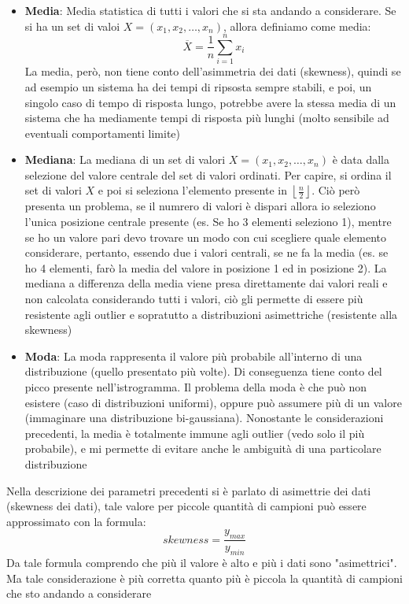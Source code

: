 \begin{itemize}
    \item \textbf{Media}: Media statistica di tutti i valori che si sta andando a considerare. Se si ha un set di valoi \(X = (x_1,x_2,\dots,x_n)\), allora definiamo come media:
    \[
    \overline{X} = \frac{1}{n}\sum_{i=1}^{n}x_i
    \]
    La media, però, non tiene conto dell'asimmetria dei dati (skewness), quindi se ad esempio un sistema ha dei tempi di ripsosta sempre stabili, e poi, un singolo caso di tempo di risposta lungo, potrebbe avere la stessa media di un sistema che ha mediamente tempi di risposta più lunghi (molto sensibile ad eventuali comportamenti limite)
    \item \textbf{Mediana}: La mediana di un set di valori \(X = (x_1,x_2,\dots,x_n)\) è data dalla selezione del valore centrale del set di valori ordinati. Per capire, si ordina il set di valori \(X\) e poi si seleziona l'elemento presente in \(\left\lfloor\frac{n}{2}\right\rfloor\). Ciò però presenta un problema, se il numrero di valori è dispari allora io seleziono l'unica posizione centrale presente (es. Se ho 3 elementi seleziono 1), mentre se ho un valore pari devo trovare un modo con cui scegliere quale elemento considerare, pertanto, essendo due i valori centrali, se ne fa la media (es. se ho 4 elementi, farò la media del valore in posizione 1 ed in posizione 2). La mediana a differenza della media viene presa direttamente dai valori reali e non calcolata considerando tutti i valori, ciò gli permette di essere più resistente agli outlier e sopratutto a distribuzioni asimettriche (resistente alla skewness)
    
    \item \textbf{Moda}: La moda rappresenta il valore più probabile all'interno di una distribuzione (quello presentato più volte). Di conseguenza tiene conto del picco presente nell'istrogramma. Il problema della moda è che può non esistere (caso di distribuzioni uniformi), oppure può assumere più di un valore (immaginare una distribuzione bi-gaussiana). Nonostante le considerazioni precedenti, la media è totalmente immune agli outlier (vedo solo il più probabile), e mi permette di evitare anche le ambiguità di una particolare distribuzione
\end{itemize}

\begin{info}
Nella descrizione dei parametri precedenti si è parlato di asimettrie dei dati (skewness dei dati), tale valore per piccole quantità di campioni può essere approssimato con la formula:
\[
skewness = \frac{y_{max}}{y_{min}}
\]
Da tale formula comprendo che più il valore è alto e più i dati sono "asimettrici". Ma tale considerazione è più corretta quanto più è piccola la quantità di campioni che sto andando a considerare 
\end{info}


